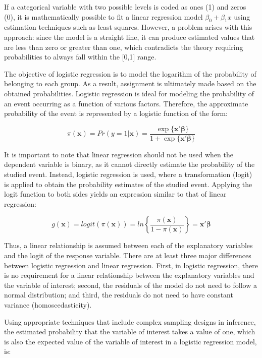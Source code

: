 \documentclass[
  12pt,
]{book}
\begin{document}
If a categorical variable with two possible levels is coded as ones (1) and zeros (0), it is mathematically possible to fit a linear regression model \(\beta_0 + \beta_1 x\) using estimation techniques such as least squares. However, a problem arises with this approach: since the model is a straight line, it can produce estimated values that are less than zero or greater than one, which contradicts the theory requiring probabilities to always fall within the {[}0,1{]} range.

The objective of logistic regression is to model the logarithm of the probability of belonging to each group. As a result, assignment is ultimately made based on the obtained probabilities. Logistic regression is ideal for modeling the probability of an event occurring as a function of various factors. Therefore, the approximate probability of the event is represented by a logistic function of the form:

\[
\pi(\textbf{x})= Pr(y = 1 | \textbf{x}) = \frac{\exp\{\textbf{x}'\boldsymbol{\beta}\}}{1+\exp\{\textbf{x}'\boldsymbol{\beta}\}}
\]

It is important to note that linear regression should not be used when the dependent variable is binary, as it cannot directly estimate the probability of the studied event. Instead, logistic regression is used, where a transformation (logit) is applied to obtain the probability estimates of the studied event. Applying the logit function to both sides yields an expression similar to that of linear regression:

\[
g(\textbf{x})=logit(\pi(\textbf{x}))=ln \left\{ \frac{\pi(\textbf{x})}{1-\pi(\textbf{x})} \right \}= \textbf{x}'\boldsymbol{\beta}
\]

Thus, a linear relationship is assumed between each of the explanatory variables and the logit of the response variable. There are at least three major differences between logistic regression and linear regression. First, in logistic regression, there is no requirement for a linear relationship between the explanatory variables and the variable of interest; second, the residuals of the model do not need to follow a normal distribution; and third, the residuals do not need to have constant variance (homoscedasticity).

Using appropriate techniques that include complex sampling designs in inference, the estimated probability that the variable of interest takes a value of one, which is also the expected value of the variable of interest in a logistic regression model, is:
\end{document}

